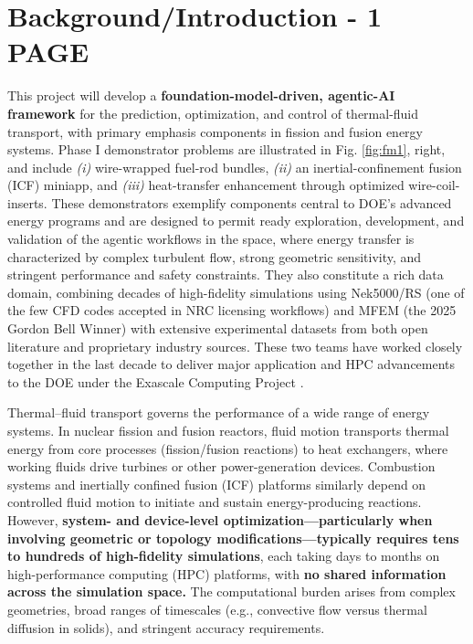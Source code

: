 \section{Background/Introduction  -   1 PAGE}

This project will develop a {\bf foundation-model-driven, agentic-AI framework}
\cite{Vinuesa2026XAI} for the prediction, optimization, and control of
thermal-fluid transport, with primary emphasis components in fission and fusion
energy systems.
  Phase I demonstrator problems are illustrated in Fig.
\ref{fig:fm1}, right, and include 
{\em (i)} wire-wrapped fuel-rod bundles, 
{\em (ii)} an inertial-confinement fusion (ICF) miniapp, and 
{\em (iii)} heat-transfer enhancement through optimized wire-coil-inserts.
  These demonstrators exemplify components central to DOE’s advanced energy
programs and are designed to permit ready exploration, development, and
validation of the agentic workflows in the space, where
    energy transfer is characterized by complex turbulent flow, strong
geometric sensitivity, and stringent performance and safety constraints.
  They also constitute a rich data domain, combining decades of high-fidelity
simulations using Nek5000/RS (one of the few CFD codes accepted in NRC
licensing workflows) and MFEM (the 2025 Gordon Bell Winner) with extensive
experimental datasets from both open literature and proprietary industry sources.
  These two teams have worked closely together in the last decade to deliver
major application and HPC advancements to the DOE under the Exascale Computing
Project \cite{ceed}.





Thermal–fluid transport governs the performance of a wide range of energy systems.
In nuclear fission and fusion reactors, fluid motion transports thermal energy
from core processes (fission/fusion reactions) to heat exchangers, where working
fluids drive turbines or other power-generation devices. Combustion systems and
inertially confined fusion (ICF) platforms similarly depend on controlled fluid
motion to initiate and sustain energy-producing reactions.
However, {\bf system- and device-level optimization—particularly when involving
geometric or topology modifications—typically requires tens to hundreds of high-fidelity
simulations}, each taking days to months on high-performance computing (HPC) platforms,
with {\bf no shared information across the simulation space.}
The computational burden arises from complex geometries, broad ranges of timescales
(e.g., convective flow versus thermal diffusion in solids), and stringent
accuracy requirements.

